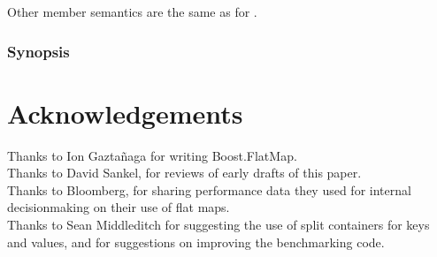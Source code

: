 Other member semantics are the same as for .

\subsubsection{ Synopsis}




\section{Acknowledgements}

Thanks to Ion Gazta\~{n}aga for writing Boost.FlatMap.\\

Thanks to David Sankel, for reviews of early drafts of this paper.\\

Thanks to Bloomberg, for sharing performance data they used for internal
decisionmaking on their use of flat maps.\\

Thanks to Sean Middleditch for suggesting the use of split containers for keys
and values, and for suggestions on improving the benchmarking code.
